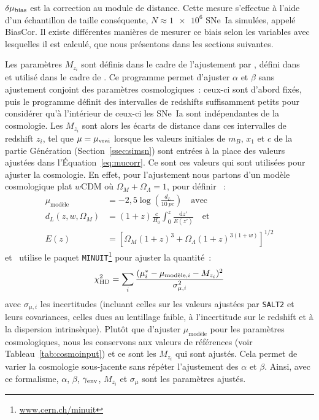 \documentclass[../main/main.tex]{subfiles}
\begin{document}
$\delta\mu_{\rm bias}$ est la correction au module de distance. Cette mesure
s'effectue à l'aide d'un échantillon de taille conséquente, $N \approx
\num{1e6}$ SNe~Ia simulées, appelé BiasCor. Il existe différentes manières de
mesurer ce biais selon les variables avec lesquelles il est calculé, que nous
présentons dans les sections suivantes.

Les paramètres $M_{z_i}$ sont définis dans le cadre de l'ajustement par \saltmu,
défini dans~\cite{marriner2011} et utilisé dans le cadre de \bbc. Ce programme
permet d'ajuster $\alpha$ et $\beta$ sans ajustement conjoint des paramètres
cosmologiques~: ceux-ci sont d'abord fixés, puis le programme définit des
intervalles de redshifts suffisamment petits pour considérer qu'à l'intérieur de
ceux-ci les SNe~Ia sont indépendantes de la cosmologie. Les $M_{z_i}$ sont alors
les écarts de distance dans ces intervalles de redshift $z_i$, tel que $\mu =
\mu_{\rm vrai}$ lorsque les valeurs initiales de $m_B$, $x_1$ et $c$ de la
partie Génération (Section~\ref{ssec:simsn}) sont entrées à la place des valeurs
ajustées dans l'Équation~\ref{eq:mucorr}. Ce sont ces valeurs qui sont utilisées
pour ajuster la cosmologie. En effet, pour l'ajustement nous partons d'un modèle
cosmologique plat $w$CDM où $\Omega_M + \Omega_{\Lambda} = 1$, pour définir
\citep{kessler2017}~:
\begin{align}\label{eq:mumodel}
    \mu_{\text{modèle}} & = -2,5\log\left(\frac{d_L}{\SI{10}{pc}}\right)
                             \quad\text{avec}\\
    d_L(z,w,\Omega_M)   & = (1+z)
                            \frac{c}{H_0}
                            \int_{0}^{z} \frac{\mathrm{d} z'}{E(z')}
                            \quad\text{et}\\
    E(z)                & = \left[ \Omega_M(1+z)^3
                                 + \Omega_{\Lambda}(1+z)^{3(1+w)}
                             \right]^{1/2}
\end{align}
et \saltmu\ utilise le paquet
\texttt{MINUIT}\footnote{\href{www.cern.ch/minuit}{www.cern.ch/minuit}}
\citep{james1975} pour ajuster la quantité~:
\begin{equation}
    \chi^2_{\rm HD} = \sum_i \frac{
                          (\mu_i^* - \mu_{\text{modèle},i} - M_{z_i})^2}{
                      \sigma_{\mu,i}^2}
\end{equation}
avec $\sigma_{\mu,i}$ les incertitudes (incluant celles sur les valeurs ajustées
par \texttt{SALT2} et leurs covariances, celles dues au lentillage faible, à
l'incertitude sur le redshift et à la dispersion intrinsèque). Plutôt que
d'ajuster $\mu_{\text{modèle}}$ pour les paramètres cosmologiques, nous les
conservons aux valeurs de références (voir Tableau~\ref{tab:cosmoinput}) et ce
sont les $M_{z_i}$ qui sont ajustés. Cela permet de varier la cosmologie
sous-jacente sans répéter l'ajustement des $\alpha$ et $\beta$. Ainsi, avec ce
formalisme, $\alpha$, $\beta$, $\gamma_{\rm env}$, $M_{z_i}$ et $\sigma_{\mu}$
sont les paramètres ajustés.
\end{document}
